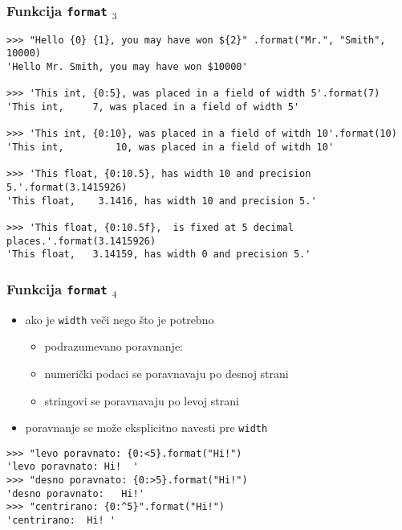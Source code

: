 \documentclass[utf8,compress]{beamer}
\begin{document}
\begin{frame}[fragile,shrink=25]
  \frametitle{Funkcija \texttt{format} $_3$}
\begin{verbatim}
>>> "Hello {0} {1}, you may have won ${2}" .format("Mr.", "Smith", 10000)
'Hello Mr. Smith, you may have won $10000'

>>> 'This int, {0:5}, was placed in a field of width 5'.format(7)
'This int,     7, was placed in a field of width 5'

>>> 'This int, {0:10}, was placed in a field of witdh 10'.format(10)
'This int,         10, was placed in a field of witdh 10'

>>> 'This float, {0:10.5}, has width 10 and precision 5.'.format(3.1415926)
'This float,    3.1416, has width 10 and precision 5.'

>>> 'This float, {0:10.5f},  is fixed at 5 decimal places.'.format(3.1415926)
'This float,   3.14159, has width 0 and precision 5.'
\end{verbatim}
\end{frame}

\begin{frame}[fragile]
  \frametitle{Funkcija \texttt{format} $_4$}
  \begin{itemize}
    \item ako je \texttt{width} veči nego što je potrebno
    \begin{itemize}
      \item podrazumevano poravnanje:
      \item numerički podaci se poravnavaju po desnoj strani
      \item stringovi se poravnavaju po levoj strani
    \end{itemize}
    \item poravnanje se može eksplicitno navesti pre \texttt{width}
  \end{itemize}
\begin{verbatim}
>>> "levo poravnato: {0:<5}.format("Hi!")
'levo poravnato: Hi!  '
>>> "desno poravnato: {0:>5}.format("Hi!")
'desno poravnato:   Hi!'
>>> "centrirano: {0:^5}".format("Hi!")
'centrirano:  Hi! '
\end{verbatim}
\end{frame}
\end{document}
